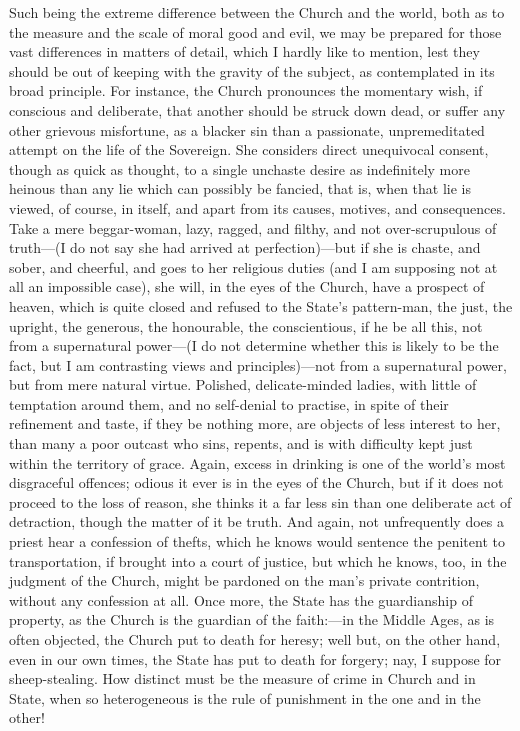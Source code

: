 Such being the extreme difference between the Church and the world,
both as to the measure and the scale of moral good and evil, we may be
prepared for those vast differences in matters of detail, which I
hardly like to mention, lest they should be out of keeping with the
gravity of the subject, as contemplated in its broad principle. For
instance, the Church pronounces the momentary wish, if conscious and
deliberate, that another should be struck down dead, or suffer any
other grievous misfortune, as a blacker sin than a passionate,
unpremeditated attempt on the life of the Sovereign. She considers
direct unequivocal consent, though as quick as thought, to a single
unchaste desire as indefinitely more heinous than any lie which can
possibly be fancied, that is, when that lie is viewed, of course, in
itself, and apart from its causes, motives, and consequences. Take a
mere beggar-woman, lazy, ragged, and filthy, and not over-scrupulous
of truth—(I do not say she had arrived at perfection)—but if she
is chaste, and sober, and cheerful, and goes to her religious duties
(and I am supposing not at all an impossible case), she will, in the
eyes of the Church, have a prospect of heaven, which is quite closed
and refused to the State's pattern-man, the just, the upright, the
generous, the honourable, the conscientious, if he be all this, not
from a supernatural power—(I do not determine whether this is likely
to be the fact, but I am contrasting views and principles)—not from
a supernatural power, but from mere natural virtue. Polished,
delicate-minded ladies, with little of temptation around them, and no
self-denial to practise, in spite of their refinement and taste, if
they be nothing more, are objects of less interest to her, than many a
poor outcast who sins, repents, and is with difficulty kept just
within the territory of grace. Again, excess in drinking is one of the
world's most disgraceful offences; odious it ever is in the eyes of
the Church, but if it does not proceed to the loss of reason, she
thinks it a far less sin than one deliberate act of detraction, though
the matter of it be truth. And again, not unfrequently does a priest
hear a confession of thefts, which he knows would sentence the
penitent to transportation, if brought into a court of justice, but
which he knows, too, in the judgment of the Church, might be pardoned
on the man's private contrition, without any confession at all. Once
more, the State has the guardianship of property, as the Church is the
guardian of the faith:—in the Middle Ages, as is often objected, the
Church put to death for heresy; well but, on the other hand, even in
our own times, the State has put to death for forgery; nay, I suppose
for sheep-stealing. How distinct must be the measure of crime in
Church and in State, when so heterogeneous is the rule of punishment
in the one and in the other!


